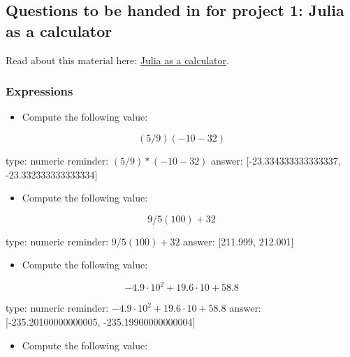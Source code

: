\documentclass[12pt]{article}
\begin{document}
\subsection{Questions to be handed in for project 1: Julia as a
calculator}

Read about this material here:
\href{http://mth229.github.io/calculator.html}{Julia as a calculator}.

\subsubsection{Expressions}

\begin{itemize}
\itemsep1pt\parskip0pt
\item
  Compute the following value:
\end{itemize}

\[
(5/9)(-10 - 32)
\]

\begin{answer}
    type: numeric
    reminder: \( (5/9) * (-10 - 32) \)
    answer: [-23.334333333333337, -23.332333333333334]

\end{answer}

\begin{itemize}
\itemsep1pt\parskip0pt
\item
  Compute the following value:
\end{itemize}

\[
9/5(100) + 32
\]

\begin{answer}
    type: numeric
    reminder: \( 9/5(100) + 32 \)
    answer: [211.999, 212.001]

\end{answer}

\begin{itemize}
\itemsep1pt\parskip0pt
\item
  Compute the following value:
\end{itemize}

\[
-4.9\cdot 10^2 + 19.6\cdot 10 + 58.8 
\]

\begin{answer}
    type: numeric
    reminder: \( -4.9\cdot 10^2 + 19.6\cdot 10 + 58.8 \)
    answer: [-235.20100000000005, -235.19900000000004]

\end{answer}

\begin{itemize}
\itemsep1pt\parskip0pt
\item
  Compute the following value:
\end{itemize}
\end{document}
